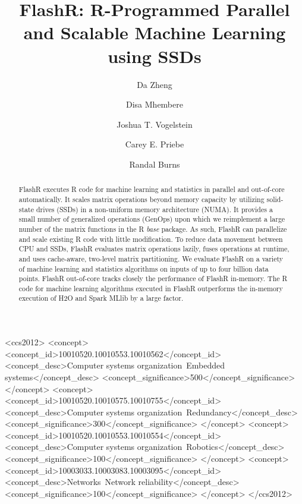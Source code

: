 \documentclass[sigconf]{acmart}
\begin{document}
\title{FlashR: R-Programmed Parallel and Scalable Machine Learning using SSDs}
\titlenote{}
\subtitle{}
\subtitlenote{}



\author[1]{\rm Da Zheng}
\author[1]{\rm Disa Mhembere}
\author[3]{\rm Joshua T. Vogelstein}
\author[2]{\rm Carey E. Priebe}
\author[1]{\rm Randal Burns}


\begin{abstract}
FlashR executes R code for machine learning and statistics 
in parallel and out-of-core automatically. It scales matrix operations
beyond memory capacity by utilizing solid-state drives (SSDs) in a non-uniform
memory architecture (NUMA). It provides a small number of generalized 
operations (GenOps) upon which we reimplement a large number of the
matrix functions in the R \textit{base} package. As such, FlashR can parallelize
and scale existing R code with little modification. To reduce data movement
between CPU and SSDs, FlashR evaluates matrix operations lazily, fuses
operations at runtime, and uses cache-aware, two-level matrix partitioning.
We evaluate FlashR on a variety of machine learning and statistics algorithms 
on inputs of up to four billion data points.
FlashR out-of-core tracks closely the performance of FlashR in-memory.
The R code for machine learning algorithms executed in FlashR
outperforms the in-memory execution of H2O and Spark MLlib by a large factor.
\end{abstract}

%
%
\begin{CCSXML}
<ccs2012>
 <concept>
  <concept_id>10010520.10010553.10010562</concept_id>
  <concept_desc>Computer systems organization~Embedded systems</concept_desc>
  <concept_significance>500</concept_significance>
 </concept>
 <concept>
  <concept_id>10010520.10010575.10010755</concept_id>
  <concept_desc>Computer systems organization~Redundancy</concept_desc>
  <concept_significance>300</concept_significance>
 </concept>
 <concept>
  <concept_id>10010520.10010553.10010554</concept_id>
  <concept_desc>Computer systems organization~Robotics</concept_desc>
  <concept_significance>100</concept_significance>
 </concept>
 <concept>
  <concept_id>10003033.10003083.10003095</concept_id>
  <concept_desc>Networks~Network reliability</concept_desc>
  <concept_significance>100</concept_significance>
 </concept>
</ccs2012>  
\end{CCSXML}
\end{document}
